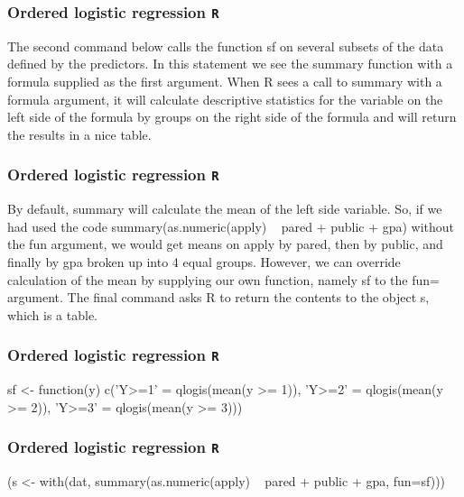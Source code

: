 \documentclass[00-GLMregslides.tex]{subfiles}
\begin{document}
\begin{frame}[fragile]
	\frametitle{Ordered logistic regression \texttt{R} }
	\Large
The second command below calls the function sf on several subsets of the data defined by the predictors. In this statement we see the summary function with a formula supplied as the first argument. When R sees a call to summary with a formula argument, it will calculate descriptive statistics for the variable on the left side of the formula by groups on the right side of the formula and will return the results in a nice table. 
\end{frame}
\begin{frame}[fragile]
	\frametitle{Ordered logistic regression \texttt{R} }
	\Large
	By default, summary will calculate the mean of the left side variable. So, if we had used the code summary(as.numeric(apply) ~ pared + public + gpa) without the fun argument, we would get means on apply by pared, then by public, and finally by gpa broken up into 4 equal groups. However, we can override calculation of the mean by supplying our own function, namely sf to the fun= argument. The final command asks R to return the contents to the object s, which is a table.
\end{frame}
\begin{frame}[fragile]
	\frametitle{Ordered logistic regression \texttt{R} }
	\Large
sf <- function(y) {
  c('Y>=1' = qlogis(mean(y >= 1)),
    'Y>=2' = qlogis(mean(y >= 2)),
    'Y>=3' = qlogis(mean(y >= 3)))
}
\end{frame}
\begin{frame}[fragile]
	\frametitle{Ordered logistic regression \texttt{R} }
	\Large
(s <- with(dat, summary(as.numeric(apply) ~ pared + public + gpa, fun=sf)))
\end{frame}
\end{document}
